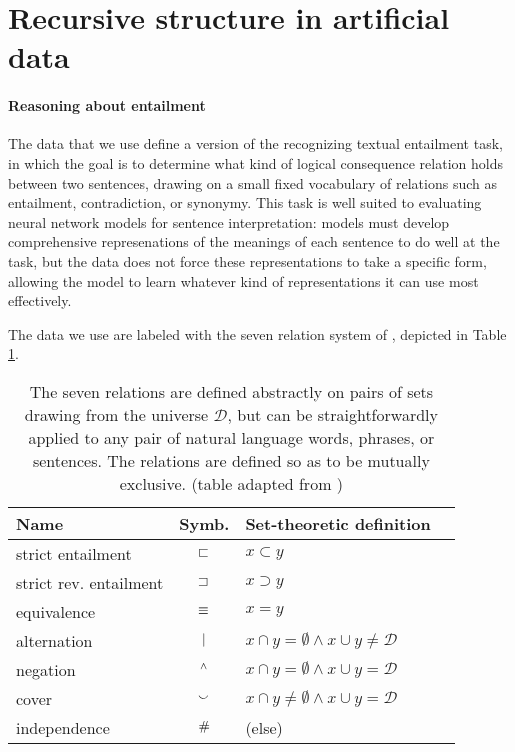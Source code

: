 \section{Recursive structure in artificial data}\label{sec:recursion}
\paragraph{Reasoning about entailment} 
The data that we use define a version of the recognizing textual entailment task, in which the goal is to determine what kind of logical consequence relation holds between two sentences, drawing on a small fixed vocabulary of relations such as entailment, contradiction, or synonymy. This task is well suited to evaluating neural network models for sentence interpretation: models must develop comprehensive represenations of the meanings of each sentence to do well at the task, but the data does not force these representations to take a specific form, allowing the model to learn whatever kind of representations it can use most effectively.

The data we use are labeled with the seven relation system of , depicted in Table \ref{b-table}.

\begin{table}[tp]
  \centering\small
  \renewcommand{\arraystretch}{1}
  \begin{tabular}{l c l l} 
    \toprule
    Name & Symb. & Set-theoretic definition \\ 
    \midrule
strict entailment         & $\sqsubset$   & $x \subset y$  \\ 
    strict rev. entailment & $\sqsupset$   & $x \supset y$  \\ 
    equivalence        & $\equiv$    & $x = y$   \\ 
    alternation        & $\mathbin{|}$   & $x \cap y = \emptyset \wedge x \cup y \neq \mathcal{D}$ \\ 
    negation           & $\mathbin{^{\wedge}}$   & $x \cap y = \emptyset \wedge x \cup y = \mathcal{D}$   \\
    cover              & $\mathbin{\smallsmile}$   & $x \cap y \neq \emptyset \wedge x \cup y = \mathcal{D}$ \\ 
    independence       & $\mathbin{\#}$   & (else)\\
    \bottomrule
  \end{tabular}
  \caption{\label{b-table}The seven relations are defined abstractly on pairs of sets drawing from the universe $\mathcal{D}$, but can be straightforwardly applied to any pair of natural language words, phrases, or sentences. The relations are defined so as to be mutually exclusive. (table adapted from \protect\citealt{Bowman:Potts:Manning:2014})} %
\end{table}


